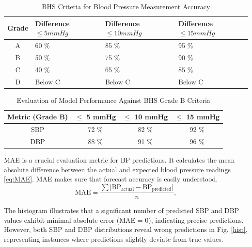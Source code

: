 \documentclass[journal,twoside,web]{ieeecolor}
\begin{document}
\begin{table}[h]
\centering
\caption{BHS Criteria for Blood Pressure Measurement Accuracy}
\begin{tabular}{|c|p{1.7cm}|p{1.7cm}|p{1.7cm}|}
\hline
\textbf{Grade} & \textbf{Difference $\leq 5 mmHg$ } & \textbf{Difference $\leq10 mmHg$ } & \textbf{Difference $\leq15 mmHg$ } \\ \hline
A & 60 \% & 85 \%& 95 \% \\ \hline
B & 50 \%& 75 \% & 90 \%\\ \hline
C & 40 \%& 65 \% & 85 \% \\ \hline
D & Below C & Below C & Below C \\ \hline
\end{tabular}
\label{tab:bhs_criteria}
\end{table}
\begin{table}[h]
\centering
\caption{Evaluation of Model Performance Against BHS Grade B Criteria}
\begin{tabular}{|c|c|c|c|}
\hline
\textbf{Metric (Grade B)} & \textbf{$\leq$ 5 mmHg } & \textbf{$\leq$ 10 mmHg } & \textbf{$\leq$ 15 mmHg } \\ \hline
SBP & 72 \% & 82 \% & 92 \% \\ \hline
DBP & 88 \% & 91 \%& 96 \%\\ \hline
\end{tabular}
\label{tab:grade_b_results}
\end{table}


MAE is a crucial evaluation metric for BP predictions. It calculates the mean absolute difference between the actual and expected blood pressure readings \ref{eq:MAE}. MAE makes sure that forecast accuracy is easily understood.
\begin{equation}
    \text{MAE} = \frac{\sum \vert \text{BP}_{\text{actual}} - \text{BP}_{\text{predicted}} \vert}{n},
    \label{eq:MAE}
\end{equation}

The histogram illustrates that a significant number of predicted SBP and DBP values exhibit minimal absolute error (MAE = 0), indicating precise predictions. However, both SBP and DBP distributions reveal wrong predictions in Fig. \ref{hist}, representing instances where predictions slightly deviate from true values. 
\end{document}
